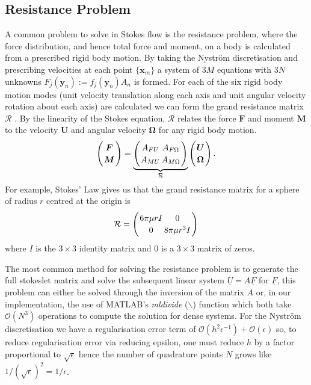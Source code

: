 \subsection{Resistance Problem} \label{sec:resistance}
A common problem to solve in Stokes flow is the resistance problem, where the force distribution, and hence total force and moment, on a body is calculated from a prescribed rigid body motion. By taking the Nyström discretisation
and prescribing velocities at each point $\{\bm{x}_m\}$ a system of $3M$ equations with $3N$ unknowns $F_j(\bm{y}_n) := f_j(\bm{y}_n)A_n$ is formed. For each of the six rigid body motion modes (unit velocity translation along each axis and unit angular velocity rotation about each axis) are calculated we can form the grand resistance matrix $\mathcal{R}$ \cite{Pozrikidis1992BoundaryFlow}. By the linearity of the Stokes equation, $\mathcal{R}$ relates the force $\mathbf{F}$ and moment $\mathbf{M}$ to the velocity $\mathbf{U}$ and angular velocity $\mathbf{\Omega}$ for any rigid body motion. 
\begin{equation}
\arraycolsep=1pt\def\arraystretch{1.2}
\left(
\begin{array}{c}
\boldsymbol{F} \\
\boldsymbol{M}
\end{array}\right)=\underbrace{\left(\begin{array}{cc}
A_{F U} & A_{F \Omega} \\
A_{M U} & A_{M \Omega}
\end{array}\right)}_{\mathcal{R}}\left(\begin{array}{c}
\boldsymbol{U} \\
\boldsymbol{\Omega}
\end{array}\right) .
\label{eq:GrandResistance}
\end{equation}
 For example, Stokes' Law gives us that the grand resistance matrix for a sphere of radius $r$ centred at the origin is
 \begin{equation}
\arraycolsep=1pt\def\arraystretch{1.2}
\mathcal{R}=\left(\begin{array}{cc}
6\pi\mu r I & 0 \\
0 & 8\pi\mu r^3 I
\end{array}\right)
\label{eq:sphereres}
\end{equation}
where $I$ is the $3\times 3$ identity matrix and $0$ is a $3\times 3$ matrix of zeros.

The most common method for solving the resistance problem is to generate the full stokeslet matrix and solve the subsequent linear system $\underline{U} = A\underline{F}$ for $\underline{F}$, this problem can either be solved through the inversion of the matrix $A$ or, in our implementation, the use of MATLAB's \textit{mldivide} ($\backslash$) function which both take $\mathcal{O}(N^3)$ operations to compute the solution for dense systems. For the Nyström discretisation we have a regularisation error term of $\mathcal{O}(h^2\epsilon^{-1})+\mathcal{O}(\epsilon)$ so, to reduce regularisation error via reducing epsilon, one must reduce $h$ by a factor proportional to $\sqrt{\epsilon}$ hence the number of quadrature points $N$ grows like $1/(\sqrt{\epsilon})^2=1/\epsilon$.

